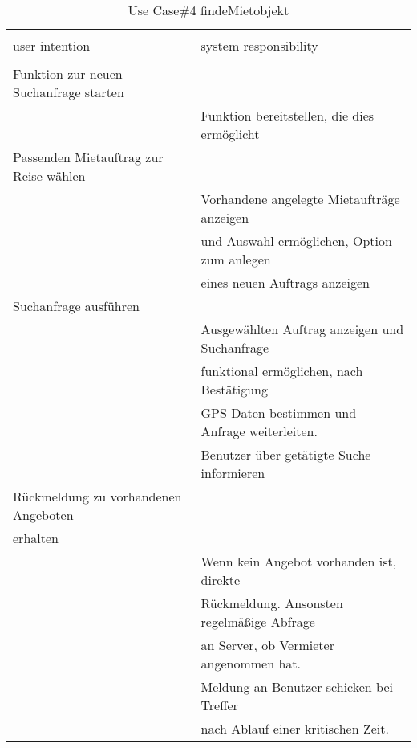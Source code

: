 \begin{table}[H]
\caption{Use Case\#4 findeMietobjekt }
\centering
\begin{tabular}{l l}
\\ [-0.5ex]

\hline\hline
\\ [-0.5ex]
user intention & system responsibility
\\ [1.5ex]
\hline
\\ [-0.5ex]
Funktion zur neuen Suchanfrage starten    &                                   \\[1ex]
                              & Funktion bereitstellen, die dies ermöglicht   \\[1ex]
Passenden Mietauftrag zur Reise wählen &                                   \\[1ex]
                              & Vorhandene angelegte Mietaufträge anzeigen \\[1ex]
                              & und Auswahl ermöglichen, Option zum anlegen   \\[1ex]
                              & eines neuen Auftrags anzeigen              \\[1ex]
Suchanfrage ausführen               &                                   \\[1ex] 
                              & Ausgewählten Auftrag anzeigen  und Suchanfrage   \\[1ex]
                              & funktional ermöglichen, nach Bestätigung      \\[1ex]
                              & GPS Daten bestimmen und Anfrage weiterleiten. \\[1ex]
                              & Benutzer über getätigte Suche informieren     \\[1ex]
Rückmeldung zu vorhandenen Angeboten   &                                   \\[1ex]
erhalten                      &                                   \\[1ex]
                              & Wenn kein Angebot vorhanden ist, direkte      \\[1ex]
                              & Rückmeldung. Ansonsten regelmäßige Abfrage    \\[1ex]
                              & an Server, ob Vermieter angenommen hat.    \\[1ex]
                              & Meldung an Benutzer schicken bei Treffer      \\[1ex]
                              & nach Ablauf einer kritischen Zeit.            \\[1ex]
\hline
\end{tabular}
\label{tab:mietobjektUC}
\end{table}


